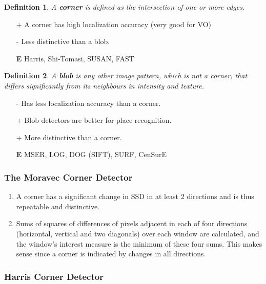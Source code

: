 \documentclass[10pt,a4paper]{scrartcl}
\newtheorem{define}{Definition}
\begin{document}
\begin{multicols*}{2}
\begin{define}
A \textbf{corner} is defined as the intersection of one or more edges.
\end{define}

\begin{itemize}
\item[+] A corner has high localization accuracy (very good for VO)
\item [-] Less distinctive than a blob.
\item [\textbf{E}] Harris, Shi-Tomasi, SUSAN, FAST
\end{itemize}

\begin{define}
A \textbf{blob} is any other image pattern, which is not a corner, that differs significantly from its neighbours in intensity and texture.
\end{define}

\begin{itemize}
\item [-] Has less localization accuracy than a corner.
\item [+] Blob detectors are better for place recognition.
\item [+] More distinctive than a corner.
\item [\textbf{E}] MSER, LOG, DOG (SIFT), SURF, CenSurE
\end{itemize}

\subsubsection{The Moravec Corner Detector}

\begin{enumerate}
\item A corner has a significant change in SSD in at least 2 directions and is thus repeatable and distinctive.
\item Sums of squares of differences of pixels adjacent in each of four directions (horizontal, vertical and two diagonals) over each window are calculated, and the window's interest measure is the minimum of these four sums. This makes sense since a corner is indicated by changes in all directions.
\end{enumerate}


\subsubsection{Harris Corner Detector}


\end{multicols*}
\end{document}
